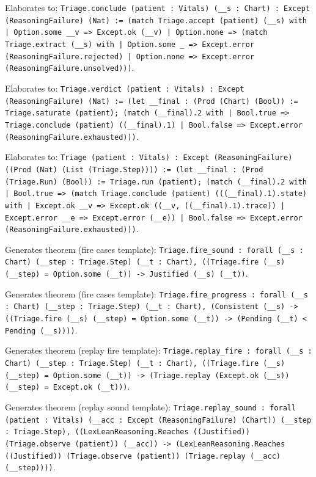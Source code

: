 \documentclass[11pt]{article}
\begin{document}
\noindent Elaborates to: \texttt{Triage.conclude (patient : Vitals) (\_\_s : Chart) : Except (ReasoningFailure) (Nat) := (match Triage.accept (patient) (\_\_s) with | Option.some \_\_v => Except.ok (\_\_v) | Option.none => (match Triage.extract (\_\_s) with | Option.some \_ => Except.error (ReasoningFailure.rejected) | Option.none => Except.error (ReasoningFailure.unsolved)))}.\par
\noindent Elaborates to: \texttt{Triage.verdict (patient : Vitals) : Except (ReasoningFailure) (Nat) := (let \_\_final : (Prod (Chart) (Bool)) := Triage.saturate (patient); (match (\_\_final).2 with | Bool.true => Triage.conclude (patient) ((\_\_final).1) | Bool.false => Except.error (ReasoningFailure.exhausted)))}.\par
\noindent Elaborates to: \texttt{Triage (patient : Vitals) : Except (ReasoningFailure) ((Prod (Nat) (List (Triage.Step)))) := (let \_\_final : (Prod (Triage.Run) (Bool)) := Triage.run (patient); (match (\_\_final).2 with | Bool.true => (match Triage.conclude (patient) (((\_\_final).1).state) with | Except.ok \_\_v => Except.ok ((\_\_v, ((\_\_final).1).trace)) | Except.error \_\_e => Except.error (\_\_e)) | Bool.false => Except.error (ReasoningFailure.exhausted)))}.\par
\noindent Generates theorem (fire cases template): \texttt{Triage.fire\_sound : forall (\_\_s : Chart) (\_\_step : Triage.Step) (\_\_t : Chart), ((Triage.fire (\_\_s) (\_\_step) = Option.some (\_\_t)) -> Justified (\_\_s) (\_\_t))}.\par
\noindent Generates theorem (fire cases template): \texttt{Triage.fire\_progress : forall (\_\_s : Chart) (\_\_step : Triage.Step) (\_\_t : Chart), (Consistent (\_\_s) -> ((Triage.fire (\_\_s) (\_\_step) = Option.some (\_\_t)) -> (Pending (\_\_t) < Pending (\_\_s))))}.\par
\noindent Generates theorem (replay fire template): \texttt{Triage.replay\_fire : forall (\_\_s : Chart) (\_\_step : Triage.Step) (\_\_t : Chart), ((Triage.fire (\_\_s) (\_\_step) = Option.some (\_\_t)) -> (Triage.replay (Except.ok (\_\_s)) (\_\_step) = Except.ok (\_\_t)))}.\par
\noindent Generates theorem (replay sound template): \texttt{Triage.replay\_sound : forall (patient : Vitals) (\_\_acc : Except (ReasoningFailure) (Chart)) (\_\_step : Triage.Step), ((LexLeanReasoning.Reaches ((Justified)) (Triage.observe (patient)) (\_\_acc)) -> (LexLeanReasoning.Reaches ((Justified)) (Triage.observe (patient)) (Triage.replay (\_\_acc) (\_\_step))))}.\par
\end{document}
